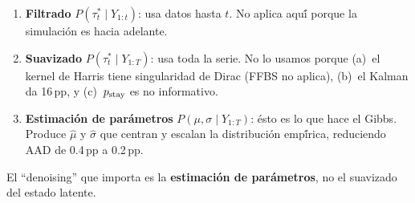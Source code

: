 \begin{enumerate}
    \item \textbf{Filtrado} $P(\tau_t^* \mid Y_{1:t})$: usa datos hasta $t$.
          No aplica aqu\'{\'i} porque la simulaci\'{o}n es hacia adelante.

    \item \textbf{Suavizado} $P(\tau_t^* \mid Y_{1:T})$: usa toda la serie.
          No lo usamos porque (a)~el kernel de Harris tiene singularidad de Dirac
          (FFBS no aplica), (b)~el Kalman da 16\,pp, y (c)~$p_{\text{stay}}$ es no informativo.

    \item \textbf{Estimaci\'{o}n de par\'{a}metros} $P(\mu, \sigma \mid Y_{1:T})$:
          \'{e}sto es lo que hace el Gibbs. Produce $\hat{\mu}$ y $\hat{\sigma}$
          que centran y escalan la distribuci\'{o}n emp\'{\'i}rica, reduciendo
          AAD de 0.4\,pp a 0.2\,pp.
\end{enumerate}

El ``denoising'' que importa es la \textbf{estimaci\'{o}n de par\'{a}metros},
no el suavizado del estado latente.